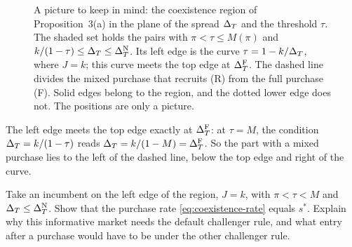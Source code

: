 \begin{figure}[htbp]
\centering
{}
\caption{A picture to keep in mind: the coexistence region of Proposition~3(a) in the plane of the spread \(\Delta_T\)
and the threshold \(\tau\). The shaded set holds the pairs with \(\pi<\tau\le M(\pi)\) and
\(k/(1-\tau)\le\Delta_T\le\Delta_T^{\rm N}\). Its left edge is the curve \(\tau=1-k/\Delta_T\), where \(J=k\); this curve meets the
top edge at \(\Delta_T^{\rm F}\). The dashed line divides the mixed purchase that recruits (R) from the full purchase (F).
Solid edges belong to the region, and the dotted lower edge does not. The positions are only a picture.}
\label{fig:coexistence-region}
\end{figure}

The left edge meets the top edge exactly at \(\Delta_T^{\rm F}\): at \(\tau=M\), the condition \(\Delta_T=k/(1-\tau)\) reads
\(\Delta_T=k/(1-M)=\Delta_T^{\rm F}\). So the part with a mixed purchase lies to the left of the dashed line, below the top edge
and right of the curve.

\begin{checkyourself}\label{q:coexistence-edge}
Take an incumbent on the left edge of the region, \(J=k\), with \(\pi<\tau<M\) and \(\Delta_T\le\Delta_T^{\rm N}\). Show that
the purchase rate \eqref{eq:coexistence-rate} equals \(s^*\). Explain why this informative market needs the default
challenger rule, and what entry after a purchase would have to be under the other challenger rule.
\end{checkyourself}

